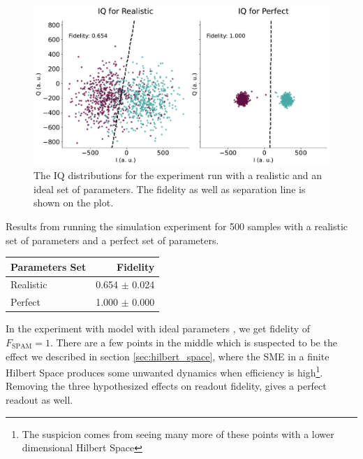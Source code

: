 \begin{figure}
    \centering
    \includegraphics[]{Simulations/budgets/figures/iq_scatter_budgetting_on_off_two.pdf}
    \caption{The IQ distributions for the experiment run with a realistic and an ideal set of parameters. The fidelity as well as separation line is shown on the plot. }
    \label{fig:realistic_perfect_comparison}
\end{figure}

\begin{margintable}[-2 cm]
    \centering
    \caption{Results from running the simulation experiment for 500 samples with a realistic set of parameters and a perfect set of parameters.}
    \begin{tabular}{l|r}
    \hline
         Parameters Set & Fidelity \\ \hline
         Realistic & 0.654 $\pm$ 0.024  \\
         Perfect   & 1.000 $\pm$ 0.000  
    \end{tabular}
    \label{tab:realistic_perfect_comparison}
\end{margintable}
In the experiment with  model with ideal parameters , we get fidelity of $F_{\text{SPAM}} = 1$. There are a few points in the middle which is suspected to be the effect we described in section \ref{sec:hilbert_space}, where  the SME in a finite Hilbert Space produces some unwanted dynamics when efficiency is high\footnote{The suspicion comes from seeing many more of these points with a lower dimensional Hilbert Space}. Removing the three hypothesized effects on readout fidelity, gives a perfect readout as well.


